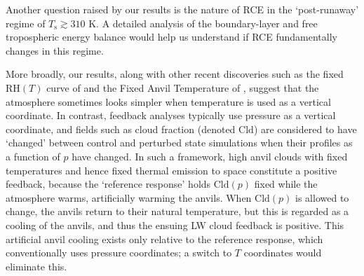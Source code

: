 \documentclass[10pt]{article}
\newcommand{\eqnref}[1]{(\ref{#1})}
\newcommand{\ppt}{\ensuremath{\partial_T}}
\newcommand{\Ts}{\ensuremath{T_\mathrm{s}}}
\newcommand{\RH}{\ensuremath{\mathrm{RH}}}
\newcommand{\cld}{\ensuremath{\mathrm{Cld}}}
\begin{document}
Another question raised by our results is the nature of RCE in the `post-runaway' regime of $\Ts \gtrsim 310 $ K. A detailed analysis of the boundary-layer and free tropospheric energy balance would help us understand if RCE fundamentally changes in this regime.



More broadly, our results, along with other recent discoveries such as the fixed $\RH(T)$ curve of \cite{romps2014} and the Fixed Anvil Temperature of \cite{hartmann2002}, suggest that the atmosphere sometimes looks simpler when temperature is used as a vertical coordinate.  In contrast, feedback analyses typically use pressure as a vertical coordinate, and fields such as cloud fraction (denoted \cld) are considered to have `changed' between control and perturbed state simulations when their profiles as a function of $p$ have changed. In such a framework, high anvil clouds with fixed temperatures and hence fixed thermal emission to space constitute a positive feedback, because the `reference response' \citep{held2012} holds $\cld(p)$ fixed  while the atmosphere warms, artificially warming the anvils. When $\cld(p)$ is allowed to change, the anvils  return to their natural temperature, but this is regarded as a cooling of the anvils, and thus the ensuing LW cloud feedback is positive. This artificial anvil cooling exists only relative to the reference response, which conventionally uses pressure coordinates; a switch to $T$ coordinates would eliminate this.

\end{document}

